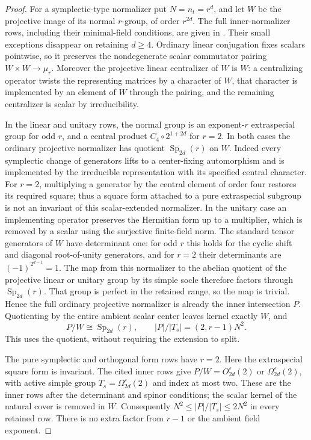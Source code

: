 \begin{proof}
For a symplectic-type normalizer put $N=n_t=r^d$, and let $W$ be
the projective image of its normal $r$-group, of order $r^{2d}$.
The full inner-normalizer rows, including their minimal-field
conditions, are given in
\cite[Section~2.2.6, pp.~70--71, Table~2.9]{BrayHoltRoneyDougal2013}.
Their small exceptions disappear on retaining $d\geq4$.
Ordinary linear conjugation fixes scalars pointwise, so it preserves
the nondegenerate scalar commutator pairing
$W\times W\to\mu_r$.  Moreover the projective linear centralizer
of $W$ is $W$: a centralizing operator twists the representing
matrices by a character of $W$, that character is implemented by
an element of $W$ through the pairing, and the remaining centralizer
is scalar by irreducibility.

In the linear and unitary rows, the normal group is an exponent-$r$
extraspecial group for odd $r$, and a central product
$C_4\circ2^{1+2d}$ for $r=2$.  In both cases the ordinary projective
normalizer has quotient $\operatorname{Sp}_{2d}(r)$ on $W$.
Indeed every symplectic change of generators lifts to a center-fixing
automorphism and is implemented by the irreducible representation
with its specified central character.  For $r=2$, multiplying a
generator by the central element of order four restores its required
square; thus a square form attached to a pure extraspecial subgroup
is not an invariant of this scalar-extended normalizer.
In the unitary case an implementing operator preserves the Hermitian
form up to a multiplier, which is removed by a scalar using the
surjective finite-field norm.
The standard tensor generators of $W$ have determinant one: for odd
$r$ this holds for the cyclic shift and diagonal root-of-unity
generators, and for $r=2$ their determinants are
$(-1)^{2^{d-1}}=1$.  The map from this normalizer to the abelian
quotient of the projective linear or unitary group by its simple
socle therefore factors through $\operatorname{Sp}_{2d}(r)$.
That group is perfect in the retained range, so the map is trivial.
Hence the full ordinary projective normalizer is already the inner
intersection $P$.  Quotienting by the entire ambient scalar center
leaves kernel exactly $W$, and
\[
 P/W\cong\operatorname{Sp}_{2d}(r),\qquad
 |P|/|T_s|=(2,r-1)N^2.
\]
This uses the quotient, without requiring the extension to split.

The pure symplectic and orthogonal form rows have $r=2$.
Here the extraspecial square form is invariant.  The cited inner
rows give $P/W=O_{2d}^{\varepsilon}(2)$ or
$\Omega_{2d}^{\varepsilon}(2)$, with active simple group
$T_s=\Omega_{2d}^{\varepsilon}(2)$ and index at most two.
These are the inner rows after the determinant and spinor conditions;
the scalar kernel of the natural cover is removed in $W$.
Consequently $N^2\leq |P|/|T_s|\leq2N^2$ in every retained row.
There is no extra factor from $r-1$ or the ambient field exponent.


\end{proof}
